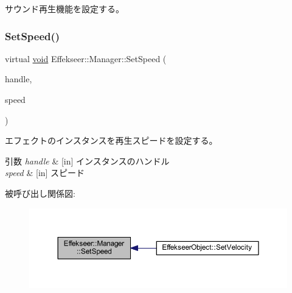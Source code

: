 サウンド再生機能を設定する。 

\mbox{\label{class_effekseer_1_1_manager_aa85b08562c442cfdce24781158a71431}} 
\subsubsection{\texorpdfstring{Set\+Speed()}{SetSpeed()}}
{\footnotesize\ttfamily virtual \mbox{\hyperlink{namespace_effekseer_ab34c4088e512200cf4c2716f168deb56}{void}} Effekseer\+::\+Manager\+::\+Set\+Speed (\begin{DoxyParamCaption}\item[{\mbox{\hyperlink{namespace_effekseer_afba58b8d812da862190e9bbfc040824a}{Handle}}}]{handle,  }\item[{float}]{speed }\end{DoxyParamCaption})\hspace{0.3cm}{\ttfamily [pure virtual]}}



エフェクトのインスタンスを再生スピードを設定する。 


\begin{DoxyParams}{引数}
{\em handle} & \mbox{[}in\mbox{]} インスタンスのハンドル \\
\hline
{\em speed} & \mbox{[}in\mbox{]} スピード \\
\hline
\end{DoxyParams}
被呼び出し関係図\+:\nopagebreak
\begin{figure}[H]
\begin{center}
\leavevmode
\includegraphics[width=350pt]{class_effekseer_1_1_manager_aa85b08562c442cfdce24781158a71431_icgraph}
\end{center}
\end{figure}
\mbox{\label{class_effekseer_1_1_manager_a1b4f22221e7068d6604c18aa4ca4b80e}} 
